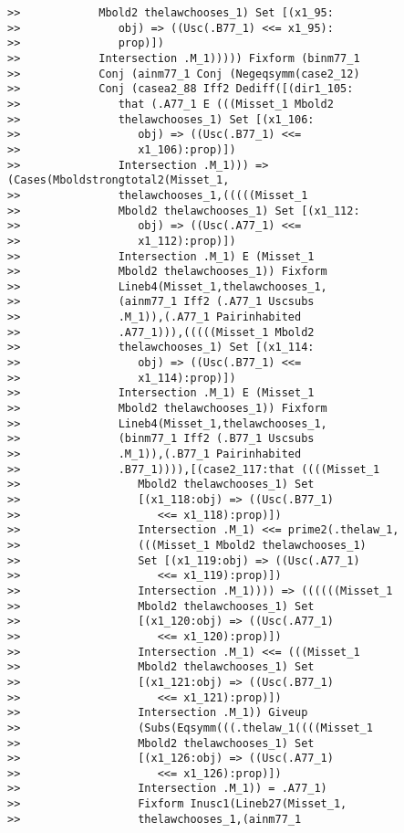 \documentclass[12pt]{article}
\begin{document}
\begin{verbatim}
>>            Mbold2 thelawchooses_1) Set [(x1_95:
>>               obj) => ((Usc(.B77_1) <<= x1_95):
>>               prop)])
>>            Intersection .M_1))))) Fixform (binm77_1
>>            Conj (ainm77_1 Conj (Negeqsymm(case2_12)
>>            Conj (casea2_88 Iff2 Dediff([(dir1_105:
>>               that (.A77_1 E (((Misset_1 Mbold2
>>               thelawchooses_1) Set [(x1_106:
>>                  obj) => ((Usc(.B77_1) <<=
>>                  x1_106):prop)])
>>               Intersection .M_1))) => (Cases(Mboldstrongtotal2(Misset_1,
>>               thelawchooses_1,(((((Misset_1
>>               Mbold2 thelawchooses_1) Set [(x1_112:
>>                  obj) => ((Usc(.A77_1) <<=
>>                  x1_112):prop)])
>>               Intersection .M_1) E (Misset_1
>>               Mbold2 thelawchooses_1)) Fixform
>>               Lineb4(Misset_1,thelawchooses_1,
>>               (ainm77_1 Iff2 (.A77_1 Uscsubs
>>               .M_1)),(.A77_1 Pairinhabited
>>               .A77_1))),(((((Misset_1 Mbold2
>>               thelawchooses_1) Set [(x1_114:
>>                  obj) => ((Usc(.B77_1) <<=
>>                  x1_114):prop)])
>>               Intersection .M_1) E (Misset_1
>>               Mbold2 thelawchooses_1)) Fixform
>>               Lineb4(Misset_1,thelawchooses_1,
>>               (binm77_1 Iff2 (.B77_1 Uscsubs
>>               .M_1)),(.B77_1 Pairinhabited
>>               .B77_1)))),[(case2_117:that ((((Misset_1
>>                  Mbold2 thelawchooses_1) Set
>>                  [(x1_118:obj) => ((Usc(.B77_1)
>>                     <<= x1_118):prop)])
>>                  Intersection .M_1) <<= prime2(.thelaw_1,
>>                  (((Misset_1 Mbold2 thelawchooses_1)
>>                  Set [(x1_119:obj) => ((Usc(.A77_1)
>>                     <<= x1_119):prop)])
>>                  Intersection .M_1)))) => ((((((Misset_1
>>                  Mbold2 thelawchooses_1) Set
>>                  [(x1_120:obj) => ((Usc(.A77_1)
>>                     <<= x1_120):prop)])
>>                  Intersection .M_1) <<= (((Misset_1
>>                  Mbold2 thelawchooses_1) Set
>>                  [(x1_121:obj) => ((Usc(.B77_1)
>>                     <<= x1_121):prop)])
>>                  Intersection .M_1)) Giveup
>>                  (Subs(Eqsymm(((.thelaw_1((((Misset_1
>>                  Mbold2 thelawchooses_1) Set
>>                  [(x1_126:obj) => ((Usc(.A77_1)
>>                     <<= x1_126):prop)])
>>                  Intersection .M_1)) = .A77_1)
>>                  Fixform Inusc1(Lineb27(Misset_1,
>>                  thelawchooses_1,(ainm77_1

\end{verbatim}
\end{document}
